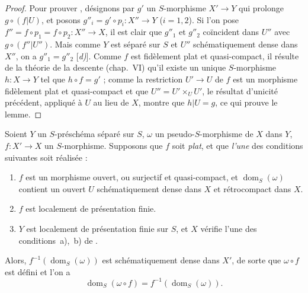 \begin{proof}
Pour prouver , désignons par $g'$ un $S$-morphisme $X'\to Y$ qui prolonge $g\circ(f|U)$, et posons $g''_i=g'\circ p_i:X''\to Y$ ($i=1,2$).
Si l'on pose $f''=f\circ p_1=f\circ p_2:X''\to X$, il est clair que $g''_1$ et $g''_2$ coïncident dans $U''$ avec $g\circ(f''|U'')$.
Mais comme $Y$ est séparé sur $S$ et $U''$ schématiquement dense dans $X''$, on a $g''_1=g''_2$ [\emph{d)}].
Comme $f$ est fidèlement plat et quasi-compact, il résulte de la théorie de la descente (chap.~VI) qu'il existe un unique $S$-morphisme $h:X\to Y$ tel que $h\circ f=g'$ ; comme la restriction $U'\to U$ de $f$ est un morphisme fidèlement plat et quasi-compact et que $U''=U'\times_U U'$, le résultat d'unicité précédent, appliqué à $U$ au lieu de $X$, montre que $h|U=g$, ce qui prouve le lemme.
\end{proof}

\begin{proposition}[20.3.11]
\label{IV.20.3.11}
Soient $Y$ un $S$-préschéma séparé sur $S$, $\omega$ un pseudo-$S$-morphisme de $X$ dans $Y$, $f:X'\to X$ un $S$-morphisme.
Supposons que $f$ soit \emph{plat}, et que \emph{l'une} des conditions suivantes soit réalisée :
\begin{enumerate}[label=\emph{(\roman*)}]
  \item $f$ est un morphisme ouvert, ou surjectif et quasi-compact, et $\operatorname{dom}_S(\omega)$ contient un ouvert $U$ schématiquement dense dans $X$ et rétrocompact dans $X$.
  \item $f$ est localement de présentation finie.
  \item $Y$ est localement de présentation finie sur $S$, et $X$ vérifie l'une des conditions~\textup{a)},~\textup{b)} de .
\end{enumerate}

Alors, $f^{-1}(\operatorname{dom}_S(\omega))$ est schématiquement dense dans $X'$, de sorte que $\omega\circ f$ est défini  et l'on a
\[
\label{IV.20.3.11.1}
  \operatorname{dom}_S(\omega\circ f)=f^{-1}(\operatorname{dom}_S(\omega)).
  \tag{20.3.11.1}
\]
\end{proposition}

